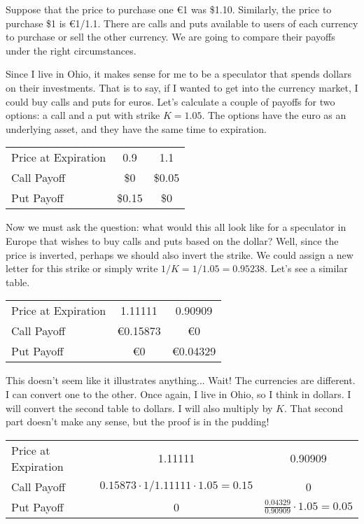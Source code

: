 \documentclass{ximera}
\begin{document}
\begin{example}
Suppose that the price to purchase one \euro{1} was \$1.10. Similarly, the price to purchase \$1 is \euro{1/1.1}. There are calls and puts available to users of each currency to purchase or sell the other currency. We are going to compare their payoffs under the right circumstances.

Since I live in Ohio, it makes sense for me to be a speculator that spends dollars on their investments. That is to say, if I wanted to get into the currency market, I could buy calls and puts for euros. Let's calculate a couple of payoffs for two options: a call and a put with strike $K=1.05$. The options have the euro as an underlying asset, and they have the same time to expiration.

	\begin{center}
		\begin{tabular}{lcc}
		Price at Expiration	&	0.9		&	1.1\\
		Call Payoff		&	\$0		&	\$0.05\\
		Put Payoff		&	\$0.15	&	\$0
		\end{tabular}
	\end{center}

Now we must ask the question: what would this all look like for a speculator in Europe that wishes to buy calls and puts based on the dollar? Well, since the price is inverted, perhaps we should also invert the strike. We could assign a new letter for this strike or simply write $1/K=1/1.05=0.95238$. Let's see a similar table.

	\begin{center}
		\begin{tabular}{lcc}
		Price at Expiration	&	1.11111		&	0.90909\\
		Call Payoff		&	\euro{0.15873}	&	\euro{0}\\
		Put Payoff		&	\euro{0}		&	\euro{0.04329}
		\end{tabular}
	\end{center}

This doesn't seem like it illustrates anything... Wait! The currencies are different. I can convert one to the other. Once again, I live in Ohio, so I think in dollars. I will convert the second table to dollars. I will also multiply by $K$. That second part doesn't make any sense, but the proof is in the pudding!

	\begin{center}
		\begin{tabular}{lcc}
		Price at Expiration	&	1.11111						&	0.90909\\
		Call Payoff		&	$0.15873\cdot 1/1.11111\cdot 1.05=0.15$	&	0\\
		Put Payoff		&	0							&	$\frac{0.04329}{0.90909}\cdot 1.05=0.05$
		\end{tabular}
	\end{center}

\end{example}
\end{document}
